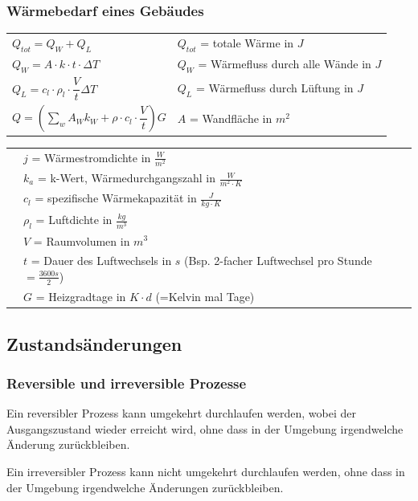			\begin{minipage}[t]{13cm}
				\subsubsection{Wärmebedarf eines Gebäudes}
					\renewcommand{\arraystretch}{2.5}
					\begin{tabular}{ p{5cm} | p{13cm}}
						$Q_{tot} = Q_W + Q_L$	&	$Q_{tot}$ = totale Wärme in $J$\\
						$Q_W = A \cdot k \cdot t \cdot \Delta T$	&	$Q_W$ = Wärmefluss durch alle Wände in $J$\\
						$Q_L = c_l \cdot \rho_l \cdot \dfrac{V}{t} \Delta T $	&	$Q_L$ = Wärmefluss durch Lüftung in $J$\\
						$Q = (\sum\limits_{w} A_W k_W + \rho \cdot c_l \cdot \dfrac{V}{t}) G$ & $A$ = Wandfläche in $m^2$\\
					\end{tabular}
					\renewcommand{\arraystretch}{1.5}
					\begin{tabular}{ p{5cm} | p{13cm} }
						& $j$ = Wärmestromdichte in $\frac{W}{m^2}$\\
						& $k_a$ = k-Wert, Wärmedurchgangszahl in $\frac{W}{m^2 \cdot K}$\\
						& $c_l$ = spezifische Wärmekapazität in $\frac{J}{kg \cdot K}$\\
						& $\rho_l$ = Luftdichte in $\frac{kg}{m^3}$\\
						& $V$ = Raumvolumen in $m^3$\\
						& $t$ = Dauer des Luftwechsels in $s$ (Bsp. 2-facher Luftwechsel pro Stunde $= \frac{3600s}{2}$)\\
						& $G$ = Heizgradtage in $K \cdot d$ (=Kelvin mal Tage)\\
					\end{tabular} 
					\renewcommand{\arraystretch}{1}
			\end{minipage}
		
	\newpage
	\subsection{Zustandsänderungen}
		\subsubsection{Reversible und irreversible Prozesse}
			\begin{minipage}[t]{13cm}
					\newline
					Ein reversibler Prozess kann umgekehrt durchlaufen werden, wobei der Ausgangszustand wieder erreicht wird, ohne dass in der Umgebung irgendwelche Änderung zurückbleiben.
			\end{minipage}
			\newline
			\newline
			\begin{minipage}[t]{13cm}
					\newline
					Ein irreversibler Prozess kann nicht umgekehrt durchlaufen werden, ohne dass in der Umgebung irgendwelche Änderungen zurückbleiben.
			\end{minipage}
	
